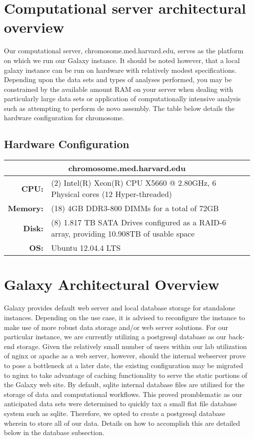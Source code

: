 \documentclass[a4paper,10pt]{article}
\begin{document}
\section{Computational server architectural overview}
Our computational server, chromosome.med.harvard.edu, serves as the platform on which we run our Galaxy instance.  It should be noted however, that a local galaxy instance can be run on hardware with relatively modest specifications.  Depending upon the data sets and types of analyses performed, you may be constrained by the available amount RAM on your server when dealing with particularly large data sets or application of computationally intensive analysis such as attempting to perform de novo assembly.  The table below details the hardware configuration for chromosome.
\subsection{Hardware Configuration}
\renewcommand{\arraystretch}{1.5}
\begin{tabular}{|r|p{.8\linewidth}|}
\hline
\multicolumn{2}{|c|}{\textbf{chromosome.med.harvard.edu}}\\
\hline
\textbf{CPU:} & (2) Intel(R) Xeon(R) CPU  X5660  @ 2.80GHz, 6 Physical cores (12 Hyper-threaded)\\
\hline
\textbf{Memory:} & (18) 4GB DDR3-800 DIMMs for a total of 72GB\\
\hline
\textbf{Disk:} & (8) 1.817 TB SATA Drives configured as a RAID-6 array, providing 10.908TB of usable space\\
\hline
\textbf{OS:} & Ubuntu 12.04.4 LTS\\
\hline
\end{tabular}
\section{Galaxy Architectural Overview}
Galaxy provides default web server and local database storage for standalone instances.  Depending on the use case, it is advised to reconfigure the instance to make use of more robust data storage and/or web server solutions.  For our particular instance, we are currently utilizing a postgresql database as our back-end storage.  Given the relatively small number of users within our lab utilization of nginx or apache as a web server, however, should the internal webserver prove to pose a bottleneck at a later date, the existing configuration may be migrated to nginx to take advantage of caching functionality to serve the static portions of the Galaxy web site.  By default, sqlite internal database files are utilized for the storage of data and computational workflows.  This proved promblematic as our anticipated data sets were determined to quickly tax a small flat file database system such as sqlite.  Therefore, we opted to create a postgresql database wherein to store all of our data.  Details on how to accomplish this are detailed below in the database subsection.
\end{document}
